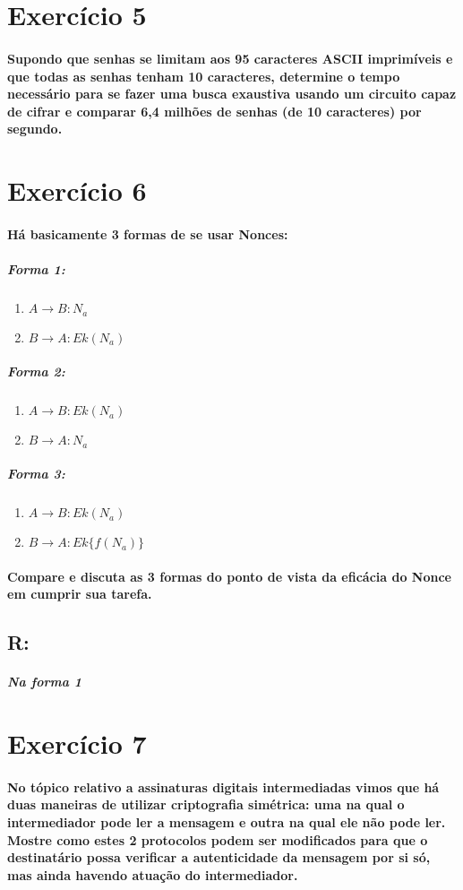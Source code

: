 \documentclass[10pt,a4paper]{report}
\begin{document}
\section*{Exercício 5}
\paragraph{ Supondo que senhas se limitam aos 95 caracteres ASCII imprimíveis e que todas as senhas tenham 10 caracteres, determine o tempo necessário para se fazer uma busca exaustiva usando um circuito capaz de cifrar e comparar 6,4 milhões de senhas (de 10 caracteres) por segundo.}
\section*{Exercício 6}
\paragraph{Há basicamente 3 formas de se usar Nonces:}
\subparagraph{Forma 1:}
\begin{enumerate}[(1)]
\item $A \rightarrow B : N_a$
\item $B \rightarrow A : Ek(N_a)$
\end{enumerate}
\subparagraph{Forma 2:}
\begin{enumerate}[(1)]
\item $A \rightarrow B : Ek(N_a)$
\item $B \rightarrow A : N_a$
\end{enumerate}
\subparagraph{Forma 3:}
\begin{enumerate}[(1)]
\item $A \rightarrow B : Ek(N_a)$
\item $B \rightarrow A : Ek\{f(N_a)\}$
\end{enumerate}
\paragraph{Compare e discuta as 3 formas do ponto de vista da eficácia do Nonce em cumprir sua tarefa.}
\subsection{R:}
\subparagraph{Na forma 1}
\section*{Exercício 7}
\paragraph{ No tópico relativo a assinaturas digitais intermediadas vimos que há duas maneiras de utilizar criptografia simétrica: uma na qual o intermediador pode ler a mensagem e outra na qual ele não pode ler. Mostre como estes 2 protocolos podem ser modificados para que o destinatário possa verificar a autenticidade da mensagem por si só, mas ainda havendo atuação do intermediador.}
\end{document}
